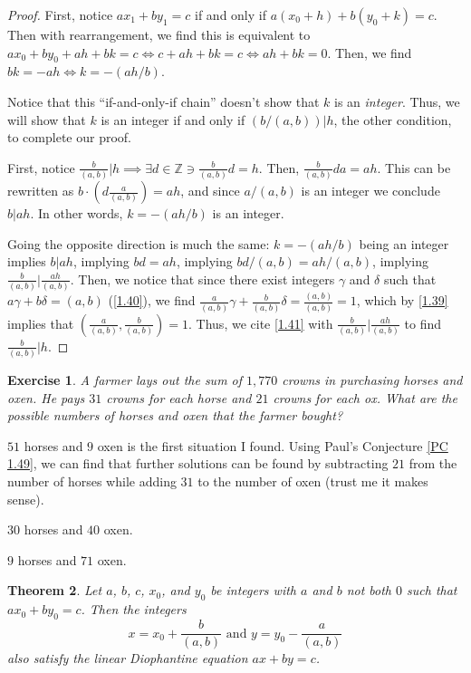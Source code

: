 \documentclass{article}
\newtheorem{thm}{Theorem}[section]
\newtheorem{ex}[thm]{Exercise}
\numberwithin{equation}{thm}
\begin{document}
\begin{proof}
  First, notice $ax_1 + by_1 = c$ if and only if $a(x_0 + h) + b(y_0 + k) = c$. Then with rearrangement, we find this is equivalent to $ax_0 + by_0 + ah + bk = c \iff c + ah + bk = c \iff ah + bk = 0$. Then, we find $bk = -ah \iff k = -(ah/b)$.

  Notice that this ``if-and-only-if chain'' doesn't show that $k$ is an \emph{integer}. Thus, we will show that $k$ is an integer if and only if $(b / (a, b)) | h$, the other condition, to complete our proof.

  First, notice $\frac{b}{(a,b)} | h \implies \exists d \in \mathbb{Z} \ni \frac{b}{(a, b)} d = h$. Then, $\frac{b}{(a, b)} da = ah$. This can be rewritten as $b \cdot (d \frac{a}{(a,b)}) = ah$, and since $a / (a,b)$ is an integer we conclude $b | ah$. In other words, $k = - (ah / b)$ is an integer.

  Going the opposite direction is much the same: $k = - (ah / b)$ being an integer implies $b | ah$, implying $bd = ah$, implying $bd / (a, b) = ah / (a, b)$, implying $\frac{b}{(a,b)} | \frac{ah}{(a,b)}$.
  Then, we notice that since there exist integers $\gamma$ and $\delta$ such that $a\gamma + b\delta = (a,b)$ (\ref{1.40}), we find $\frac{a}{(a,b)} \gamma + \frac{b}{(a,b)} \delta = \frac{(a,b)}{(a,b)} = 1$, which by \ref{1.39} implies that $(\frac{a}{(a,b)}, \frac{b}{(a,b)}) = 1$.
  Thus, we cite \ref{1.41} with $\frac{b}{(a,b)} | \frac{ah}{(a,b)}$ to find $\frac{b}{(a,b)} | h$.
\end{proof}



\begin{ex} \label{1.50}
  A farmer lays out the sum of $1,770$ crowns in purchasing horses and oxen. He pays $31$ crowns for each horse and $21$ crowns for each ox. What are the possible numbers of horses and oxen that the farmer bought?
\end{ex}

$51$ horses and $9$ oxen is the first situation I found. Using Paul's Conjecture \ref{PC 1.49}, we can find that further solutions can be found by subtracting $21$ from the number of horses while adding $31$ to the number of oxen (trust me it makes sense).

$30$ horses and $40$ oxen.

$9$ horses and $71$ oxen.



\begin{thm} \label{1.51}
  Let $a$, $b$, $c$, $x_0$, and $y_0$ be integers with $a$ and $b$ not both $0$ such that $ax_0 + by_0 = c$. Then the integers
  $$x = x_0 + \frac{b}{(a, b)} \mbox{ and } y = y_0 - \frac{a}{(a,b)}$$
  also satisfy the linear Diophantine equation $ax + by = c$.
\end{thm}
\end{document}
